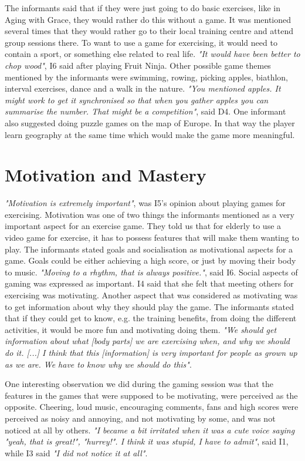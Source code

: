The informants said that if they were just going to do basic exercises, like in Aging with Grace, they would rather do this without a game. It was mentioned several times that they would rather go to their local training centre and attend group sessions there. To want to use a game for exercising, it would need to contain a sport, or something else related to real life. \emph{"It would have been better to chop wood"}, I6 said after playing Fruit Ninja. Other possible game themes mentioned by the informants were swimming, rowing, picking apples, biathlon, interval exercises, dance and a walk in the nature. \emph{"You mentioned apples. It might work to get it synchronised so that when you gather apples you can summarise the number. That might be a competition"}, said D4. One informant also suggested doing puzzle games on the map of Europe. In that way the player learn geography at the same time which would make the game more meaningful.

\section{Motivation and Mastery}

\emph{"Motivation is extremely important"}, was I5's opinion about playing games for exercising. Motivation was one of two things the informants mentioned as a very important aspect for an exercise game. They told us that for elderly to use a video game for exercise, it has to possess features that will make them wanting to play. The informants stated goals and socialisation as motivational aspects for a game. Goals could be either achieving a high score, or just by moving their body to music.  \emph{"Moving to a rhythm, that is always positive."}, said I6. Social aspects of gaming was expressed as important. I4 said that she felt that meeting others for exercising was motivating.   Another aspect that was considered as motivating was to get information about why they should play the game. The informants stated that if they could get to know, e.g. the training benefits, from doing the different activities, it would be more fun and motivating doing them. \emph{"We should get information about what [body parts] we are exercising when, and why we should do it. [...] I think that this [information] is very important for people as grown up as we are. We have to know why we should do this"}. 

One interesting observation we did during the gaming session was that the features in the games that were supposed to be motivating, were perceived as the opposite. Cheering, loud music, encouraging comments, fans and high scores were perceived as noisy and annoying, and not motivating by some, and was not noticed at all by others. \emph{"I became a bit irritated when it was a cute voice saying "yeah, that is great!", "hurrey!". I think it was stupid, I have to admit"}, said I1, while I3 said \emph{"I did not notice it at all"}. 

